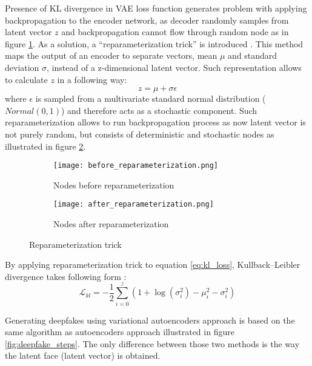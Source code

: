 Presence of KL divergence in VAE loss function generates problem with applying backpropagation to the encoder network, as decoder randomly samples from latent vector \(z\) and backpropagation cannot flow through random node as in figure \ref{subfig:before_reparameterization}. As a solution, a ``reparameterization trick'' is introduced \cite{reparameterization_trick_bib}. This method maps the output of an encoder to separate vectors, mean \(\mu\) and standard deviation \(\sigma\), instead of a z-dimensional latent vector. Such representation allows to calculate \(z\) in a following way:
%
\begin{equation}
\label{eq:rec_loss}
z = \mu + \sigma\epsilon
\end{equation}
%
where \(\epsilon\) is sampled from a multivariate standard normal distribution (\(Normal(0,1)\)) and therefore acts as a stochastic component. Such reparameterization allows to run backpropagation process as now latent vector is not purely random, but consists of deterministic and stochastic nodes as illustrated in figure \ref{subfig:after_reparameterization}.

\begin{figure}[H]
\centering
\begin{subfigure}{.5\textwidth}
  \centering
  \texttt{[image: before\_reparameterization.png]}
  \caption{Nodes before reparameterization}
  \label{subfig:before_reparameterization}
\end{subfigure}%
\begin{subfigure}{.5\textwidth}
  \centering
  \texttt{[image: after\_reparameterization.png]}
  \caption{Nodes after reparameterization}
  \label{subfig:after_reparameterization}
\end{subfigure}
\caption{Reparameterization trick}
\label{fig:reparameterization_trick}
\end{figure}

By applying reparameterization trick to equation \ref{eq:kl_loss}, Kullback–Leibler divergence takes following form \cite{kl_divergence_loss_bib}:
%
\begin{equation}
\label{eq:final_kl_loss}
\mathcal{L}_{kl} = -\frac{1}{2}\sum_{i=0}^{z}(1 + \log(\sigma_i^2) - \mu_i^2 -\sigma_i^2)
\end{equation}

Generating deepfakes using variational autoencoders approach is based on the same algorithm as autoencoders approach illustrated in figure \ref{fig:deepfake_steps}. The only difference between those two methods is the way the latent face (latent vector) is obtained.

